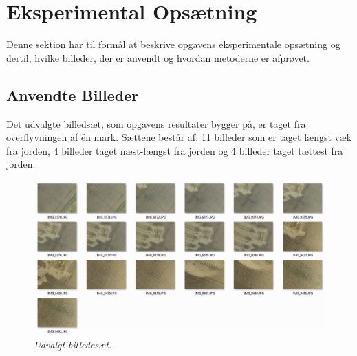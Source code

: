 \chapter{Eksperimental Opsætning}
Denne sektion har til formål at beskrive opgavens eksperimentale opsætning og dertil, hvilke billeder, der er anvendt og hvordan metoderne er afprøvet.
\section{Anvendte Billeder}
Det udvalgte billedsæt, som opgavens resultater bygger på, er taget fra overflyvningen af én mark. Sættene består af: 11 billeder som er taget længst væk fra jorden, 4 billeder taget næst-længst fra jorden og 4 billeder taget tættest fra jorden.
\begin{figure}[H]
    \centering
    \includegraphics[width=1\textwidth]{fig/43.png}
    \vspace{-0.5em}   
    \begin{center}
    \caption{{\footnotesize \textit{Udvalgt billedesæt.}}}
    \label{fig:lindblob}
     \end{center}
  \end{figure}
       \vspace{-2.7em}
\noindent
